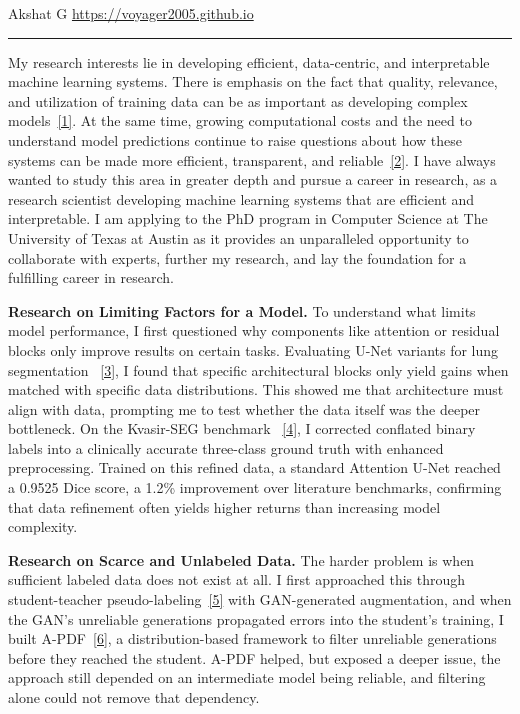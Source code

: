 \documentclass[12pt]{article}
\begin{document}
{\small Akshat G \hfill \url{https://voyager2005.github.io} \par}
\vspace{4pt}
\hrule
\vspace{8pt}

My research interests lie in developing efficient, data-centric, and interpretable machine learning systems.  There is emphasis on the fact that quality, relevance, and utilization of training data can be as important as developing complex models~\hyperref[ref1]{[1]}. At the same time, growing computational costs and the need to understand model predictions continue to raise questions about how these systems can be made more efficient, transparent, and reliable~\hyperref[ref2]{[2]}. I have always wanted to study this area in greater depth and pursue a career in research, as a research scientist developing machine learning systems that are efficient and interpretable. I am applying to the PhD program in Computer Science at The University of Texas at Austin as it provides an unparalleled opportunity to collaborate with experts, further my research, and lay the foundation for a fulfilling career in research.

\vspace{8pt}

\textbf{Research on Limiting Factors for a Model.} To understand what limits model performance, I first questioned why components like attention or residual blocks only improve results on certain tasks. Evaluating U-Net variants for lung segmentation ~\hyperref[ref3]{[3]}, I found that specific architectural blocks only yield gains when matched with specific data distributions. This showed me that architecture must align with data, prompting me to test whether the data itself was the deeper bottleneck. On the Kvasir-SEG benchmark ~\hyperref[ref4]{[4]}, I corrected conflated binary labels into a clinically accurate three-class ground truth with enhanced preprocessing. Trained on this refined data, a standard Attention U-Net reached a 0.9525 Dice score, a 1.2\% improvement over literature benchmarks, confirming that data refinement often yields higher returns than increasing model complexity.


\vspace{8pt}

\textbf{Research on Scarce and Unlabeled Data.} The harder problem is when sufficient labeled data does not exist at all. I first approached this through student-teacher pseudo-labeling~\hyperref[ref5]{[5]} with GAN-generated augmentation, and when the GAN's unreliable generations propagated errors into the student's training, I built A-PDF~\hyperref[ref6]{[6]}, a distribution-based framework to filter unreliable generations before they reached the student. A-PDF helped, but exposed a deeper issue, the approach still depended on an intermediate model being reliable, and filtering alone could not remove that dependency.
\end{document}
